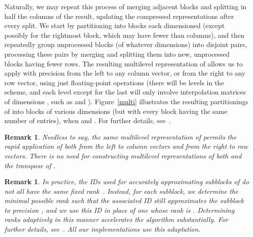 \documentclass[final,3p,times]{elsarticle}
\newtheorem{remark1}[theorem]{Remark}
\newenvironment{remark}{\begin{remark1}\rm}{\end{remark1}}
\begin{document}
Naturally, we may repeat this process of merging adjacent blocks
and splitting in half the columns of the result,
updating the compressed representations after every split.
We start by partitioning  into blocks
each dimensioned 
(except possibly for the rightmost block, which may have fewer 
than  columns),
and then repeatedly group unprocessed blocks (of whatever dimensions)
into disjoint pairs, processing these pairs by merging and splitting them
into new, unprocessed blocks having fewer rows.
The resulting multilevel representation of  allows us to apply 
with precision 
from the left to any column vector, or from the right to any row vector,
using just  floating-point operations
(there will be  levels in the scheme,
and each level except for the last
will only involve  interpolation matrices
of dimensions ,
such as  and ).
Figure~\ref{multi} illustrates the resulting partitionings of  into blocks
of various dimensions (but with every block having the same number of entries),
when  and .
For further details, see~\cite{oneil-woolfe-rokhlin}.

\begin{remark}
Needless to say, the same multilevel representation of 
permits the rapid application of  both from the left to column vectors
and from the right to row vectors.
There is no need for constructing multilevel representations
of both  and the transpose of .
\end{remark}

\begin{remark}
\label{adaptivity}
In practice, the IDs used for accurately approximating subblocks of 
do not all have the same fixed rank~. Instead, for each subblock,
we determine the minimal possible rank such that the associated ID still
approximates the subblock to precision , and we use this ID
in place of one whose rank is .
Determining ranks adaptively in this manner accelerates the algorithm
substantially. For further details, see~\cite{oneil-woolfe-rokhlin}.
All our implementations use this adaptation.
\end{remark}
\end{document}
